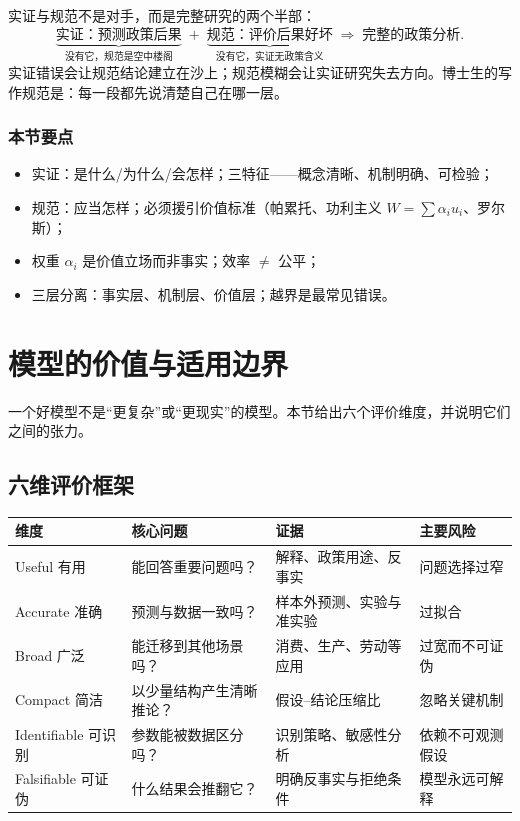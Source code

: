 实证与规范不是对手，而是完整研究的两个半部：
\[
\underbrace{\text{实证：预测政策后果}}_{\text{没有它，规范是空中楼阁}}
\;+\;
\underbrace{\text{规范：评价后果好坏}}_{\text{没有它，实证无政策含义}}
\;\Longrightarrow\; \text{完整的政策分析}.
\]
实证错误会让规范结论建立在沙上；规范模糊会让实证研究失去方向。博士生的写作规范是：每一段都先说清楚自己在哪一层。



\subsubsection*{本节要点}


\begin{itemize}
  \item 实证：是什么/为什么/会怎样；三特征——概念清晰、机制明确、可检验；
  \item 规范：应当怎样；必须援引价值标准（帕累托、功利主义 $W=\sum\alpha_i u_i$、罗尔斯）；
  \item 权重 $\alpha_i$ 是价值立场而非事实；效率 $\neq$ 公平；
  \item 三层分离：事实层、机制层、价值层；越界是最常见错误。
\end{itemize}

\section{模型的价值与适用边界}

一个好模型不是“更复杂”或“更现实”的模型。本节给出六个评价维度，并说明它们之间的张力。

\subsection{六维评价框架}

\begin{center}
\small
\begin{tabular}{p{2.6cm}p{4.3cm}p{4.2cm}p{3.4cm}}
\toprule
维度 & 核心问题 & 证据 & 主要风险 \\
\midrule
Useful 有用 & 能回答重要问题吗？ & 解释、政策用途、反事实 & 问题选择过窄 \\
Accurate 准确 & 预测与数据一致吗？ & 样本外预测、实验与准实验 & 过拟合 \\
Broad 广泛 & 能迁移到其他场景吗？ & 消费、生产、劳动等应用 & 过宽而不可证伪 \\
Compact 简洁 & 以少量结构产生清晰推论？ & 假设–结论压缩比 & 忽略关键机制 \\
Identifiable 可识别 & 参数能被数据区分吗？ & 识别策略、敏感性分析 & 依赖不可观测假设 \\
Falsifiable 可证伪 & 什么结果会推翻它？ & 明确反事实与拒绝条件 & 模型永远可解释 \\
\bottomrule
\end{tabular}
\end{center}

